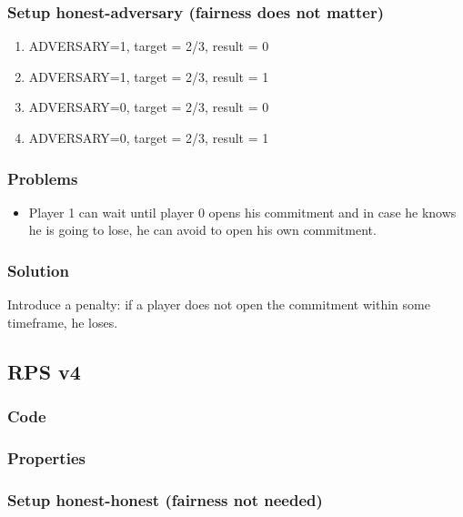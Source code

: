 \documentclass{article}
\begin{document}
\subsubsection{Setup honest-adversary (fairness does not matter)}

\begin{enumerate}
\item ADVERSARY=1, target = 2/3, result = 0
\item ADVERSARY=1, target = 2/3, result = 1
\item ADVERSARY=0, target = 2/3, result = 0
\item ADVERSARY=0, target = 2/3, result = 1
\end{enumerate}

\subsubsection{Problems}

\begin{itemize}
\item Player 1 can wait until player 0 opens his commitment and in case he knows he is going to lose, he can 
avoid to open his own commitment.
\end{itemize}

\subsubsection{Solution}
Introduce a penalty: if a player does not open the commitment within some timeframe, he loses.

\subsection{RPS v4}
\subsubsection{Code}



\subsubsection{Properties}



\subsubsection{Setup honest-honest (fairness not needed)}
\end{document}
